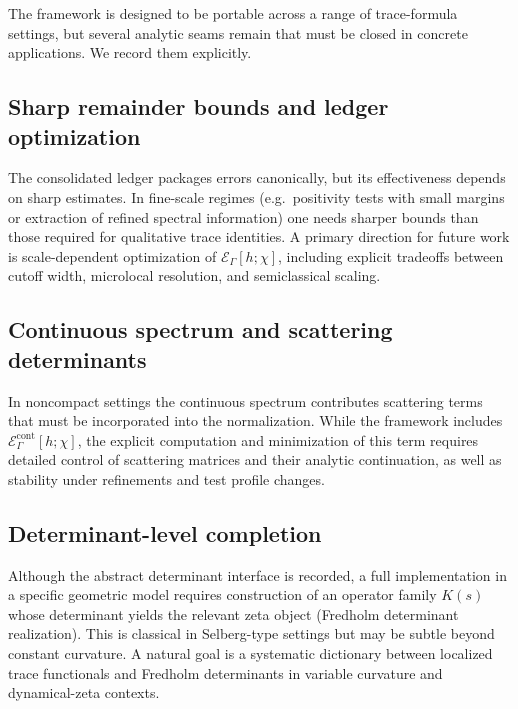 The framework is designed to be portable across a range of trace-formula settings, but several analytic seams remain that must be
closed in concrete applications.  We record them explicitly.

\subsection{Sharp remainder bounds and ledger optimization}
\label{subsec:11.open.remainder}

The consolidated ledger packages errors canonically, but its effectiveness depends on sharp estimates.
In fine-scale regimes (e.g.\ positivity tests with small margins or extraction of refined spectral information) one needs sharper
bounds than those required for qualitative trace identities.  A primary direction for future work is scale-dependent optimization of
$\mathcal E_\Gamma[h;\chi]$, including explicit tradeoffs between cutoff width, microlocal resolution, and semiclassical scaling.

\subsection{Continuous spectrum and scattering determinants}
\label{subsec:11.open.cont}

In noncompact settings the continuous spectrum contributes scattering terms that must be incorporated into the normalization.
While the framework includes $\mathcal E^{\mathrm{cont}}_\Gamma[h;\chi]$, the explicit computation and minimization of this term
requires detailed control of scattering matrices and their analytic continuation, as well as stability under refinements and test
profile changes.

\subsection{Determinant-level completion}
\label{subsec:11.open.det}

Although the abstract determinant interface is recorded, a full implementation in a specific geometric model requires construction
of an operator family $K(s)$ whose determinant yields the relevant zeta object (Fredholm determinant realization).  This is classical
in Selberg-type settings but may be subtle beyond constant curvature.  A natural goal is a systematic dictionary between localized
trace functionals and Fredholm determinants in variable curvature and dynamical-zeta contexts.

